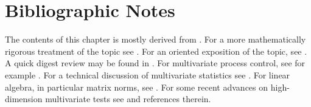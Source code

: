 \section{Bibliographic Notes}
The contents of this chapter is mostly derived from \cite{montgomery_introduction_2007}. 
For a more mathematically rigorous treatment of the topic see \cite{basseville_detection_1993}.
For an \R oriented exposition of the topic, see \cite{qiu_introduction_2013}.
A quick digest review may be found in \cite{natrella_nist/sematech_2010}.
For multivariate process control, see for example \cite{ge_multivariate_2012}. 
For a technical discussion of multivariate statistics see \cite{anderson_introduction_2003}. 
For linear algebra, in particular matrix norms, see \cite{meyer_matrix_2001}. 
For some recent advances on high-dimension multivariate tests see \cite{srivastava_testing_2013} and references therein.
